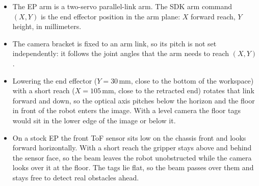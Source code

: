 
\label{sec:arm}

\begin{itemize}
  \item The EP arm is a two-servo parallel-link arm. The SDK arm command $(X,Y)$ is the end effector position in the
        arm plane: $X$ forward reach, $Y$ height, in millimeters.
  \item The camera bracket is fixed to an arm link, so its pitch is not set independently: it follows the joint
        angles that the arm needs to reach $(X,Y)$.
  \item Lowering the end effector ($Y=30$\,mm, close to the bottom of the workspace) with a short reach
        ($X=105$\,mm, close to the retracted end) rotates that link forward and down, so the optical axis pitches below
        the horizon and the floor in front of the robot enters the image. With a level camera the floor tags would sit
        in the lower edge of the image or below it.
  \item On a stock EP the front ToF sensor sits low on the chassis front and looks forward horizontally. With a short
        reach the gripper stays above and behind the sensor face, so the beam leaves the robot unobstructed while the
        camera looks over it at the floor. The tags lie flat, so the beam passes over them and stays free to detect real
        obstacles ahead.
\end{itemize}


